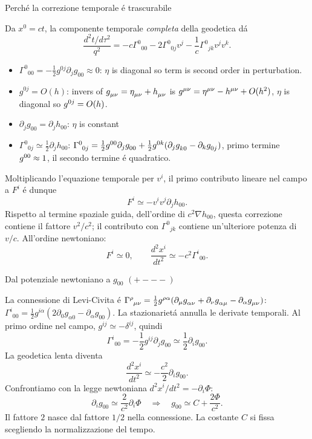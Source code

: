 \begin{frame}[t]{Perch\'e la correzione temporale \'e trascurabile}
\small\raggedright
Da $x^0=ct$, la componente temporale \emph{completa} della geodetica d\'a
\[
\frac{d^2t/d\tau^2}{q^2}
=-c\Gamma^0{}_{00}
-2\Gamma^0{}_{0j}v^j
-\frac1c\Gamma^0{}_{jk}v^jv^k.
\]
\begin{itemize}
    \item  $\Gamma^0{}_{00}=-\frac12g^{0j}\partial_jg_{00}\approx 0$: $\eta$ is diagonal so term is second order in perturbation. 
    \item $g^{0j}=O(h)$: invers of $\tensor{g}{_{\mu\nu}}=\tensor{\eta}{_{\mu\nu}}+\tensor{h}{_{\mu\nu}}$ is $\tensor{g}{^{\mu\nu}}=\tensor{\eta}{^{\mu\nu}}-\tensor{h}{^{\mu\nu}}+O(h^2)$, $\eta$ is diagonal so $g\indices{^{0j}}=O(h)$.
    \item  $\partial_jg_{00}=\partial_jh_{00}$: $\eta$ is constant
    \item $\Gamma^0{}_{0j}\simeq\frac12\partial_jh_{00}$: $\Gamma\indices{^0_{0j}}=\frac12 g\indices{^{00}}\partial_jg\indices{_{00}}+\frac12 g\indices{^{0k}}(\partial_jg\indices{_{k0}}-\partial_kg\indices{_{0j}})$, primo termine $g\indices{^{00}}\approx1$, il secondo termine \'e quadratico.
\end{itemize}
Moltiplicando l'equazione temporale per $v^i$, il primo contributo lineare nel campo a $F^i$ \'e dunque
\[
F^i\simeq-v^iv^j\partial_jh_{00}.
\]
Rispetto al termine spaziale guida, dell'ordine di $c^2\nabla h_{00}$,
questa correzione contiene il fattore $v^2/c^2$; il contributo con
$\Gamma^0{}_{jk}$ contiene un'ulteriore potenza di $v/c$.
All'ordine newtoniano:
\[
\boxed{F^i\simeq0,\qquad
\frac{d^2x^i}{dt^2}\simeq-c^2\Gamma^i{}_{00}.}
\]
\end{frame}

\begin{frame}[t]{Dal potenziale newtoniano a $g_{00}$ $(+---)$}
\small\raggedright
La connessione di Levi-Civita \'e $\Gamma\indices{^{\rho}_{\mu\nu}}=\frac12 g\indices{^{\rho\alpha}}(\partial_{\mu}g\indices{_{\alpha\nu}}+\partial_{\nu}g\indices{_{\alpha\mu}}-\partial_{\alpha}g\indices{_{\mu\nu}})$: $\Gamma^i{}_{00}=\frac12g^{i\alpha}\left(2\partial_0g_{\alpha0}-\partial_\alpha g_{00}\right)$.
La stazionariet\'a annulla le derivate temporali. Al primo ordine nel campo,
$g^{ij}\simeq-\delta^{ij}$, quindi
\[
\Gamma^i{}_{00}=-\frac12g^{ij}\partial_jg_{00}
\simeq\frac12\partial_i g_{00}.
\]
La geodetica lenta diventa
\[
\frac{d^2x^i}{dt^2}\simeq-\frac{c^2}{2}\partial_i g_{00}.
\]
Confrontiamo con la legge newtoniana $d^2x^i/dt^2=-\partial_i\Phi$:
\[
\partial_i g_{00}\simeq\frac{2}{c^2}\partial_i\Phi
\quad\Longrightarrow\quad
\boxed{g_{00}\simeq C+\frac{2\Phi}{c^2}.}
\]
Il fattore $2$ nasce dal fattore $1/2$ nella connessione.
La costante $C$ si fissa scegliendo la normalizzazione del tempo.
\end{frame}

